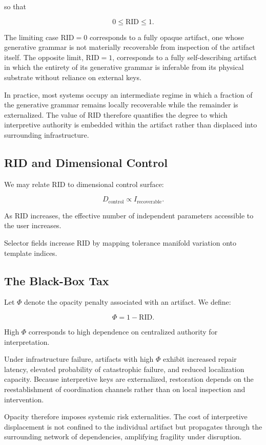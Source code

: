 \documentclass[11pt]{article}
\begin{document}
so that

\[
0 \leq \text{RID} \leq 1.
\]

The limiting case $\text{RID} = 0$ corresponds to a fully opaque
artifact, one whose generative grammar is not materially recoverable
from inspection of the artifact itself. The opposite limit,
$\text{RID} = 1$, corresponds to a fully self-describing artifact in
which the entirety of its generative grammar is inferable from its
physical substrate without reliance on external keys.

In practice, most systems occupy an intermediate regime in which a
fraction of the generative grammar remains locally recoverable while
the remainder is externalized. The value of $\text{RID}$ therefore
quantifies the degree to which interpretive authority is embedded within
the artifact rather than displaced into surrounding infrastructure.

\subsection{RID and Dimensional Control}

We may relate RID to dimensional control surface:

\[
D_{\text{control}} \propto I_{\text{recoverable}}.
\]

As RID increases, the effective number of independent parameters 
accessible to the user increases.

Selector fields increase RID by mapping tolerance manifold variation 
onto template indices.

\subsection{The Black-Box Tax}

Let $\Phi$ denote the opacity penalty associated with an artifact. 
We define:

\[
\Phi = 1 - \text{RID}.
\]

High $\Phi$ corresponds to high dependence on centralized authority 
for interpretation.

Under infrastructure failure, artifacts with high $\Phi$ exhibit
increased repair latency, elevated probability of catastrophic failure,
and reduced localization capacity. Because interpretive keys are
externalized, restoration depends on the reestablishment of coordination
channels rather than on local inspection and intervention.

Opacity therefore imposes systemic risk externalities. The cost of
interpretive displacement is not confined to the individual artifact
but propagates through the surrounding network of dependencies,
amplifying fragility under disruption.
\end{document}
